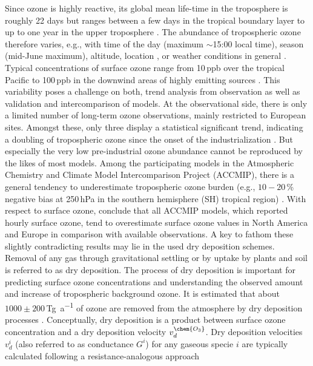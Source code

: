 \documentclass[gmd, manuscript]{copernicus}
\begin{document}
Since ozone is highly reactive, its global mean life-time in the troposphere is roughly 22 days but ranges between a few days in the tropical boundary layer to up to one year in the upper troposphere \citep{JGR:Stevenson2005,ACP:Young2013}. The abundance of tropospheric ozone therefore varies, e.g., with time of the day (maximum $\sim$15:00 local time), season (mid-June maximum), altitude, location \citep{ACP:Schnell2015}, or weather conditions in general \citep{ACP:Otero2018}. Typical concentrations of surface ozone range from 10\,\unit{ppb} over the tropical Pacific to 100\,\unit{ppb} in the downwind areas of highly emitting sources \citep[Chapter 8]{IPCC2013}. This variability poses a challenge on both, trend analysis from observation as well as validation and intercomparison of models. At the observational side, there is only a limited number of long-term ozone observations, mainly restricted to European sites. Amongst these, only three display a statistical significant trend, indicating a doubling of tropospheric ozone since the onset of the industrialization \citep[Chapter 2]{IPCC2013}. But especially the very low pre-industrial ozone abundance cannot be reproduced by the likes of most models. Among the participating models in the Atmospheric Chemistry and Climate Model Intercomparison Project (ACCMIP), there is a general tendency to underestimate tropospheric ozone burden (e.g., $10-20$\,\unit{\%} negative bias at 250\,\unit{hPa} in the southern hemisphere (SH) tropical region) \citep[Chapter 8]{IPCC2013}. With respect to surface ozone, \citet{ACP:Schnell2015} conclude that all ACCMIP models, which reported hourly surface ozone, tend to overestimate surface ozone values in North America and Europe in comparison with available observations. A key to fathom these slightly contradicting results may lie in the used dry deposition schemes.\\
Removal of any gas through gravitational settling or by uptake by plants and soil is referred to as dry deposition. The process of dry deposition is important for predicting surface ozone concentrations and understanding the observed amount and increase of tropospheric background ozone. It is estimated that about $1000 \pm 200$\,\unit{Tg a^{-1}} of ozone are removed from the atmosphere by dry deposition processes \citep{ACP:Monks2015}. Conceptually, dry deposition is a product between surface ozone concentration  and a dry deposition velocity $v^\chem{O_3}_d$. Dry deposition velocities $v^i_d$ (also referred to as conductance $G^i$) for any gaseous specie $i$ are typically calculated following a resistance-analogous approach
\end{document}

